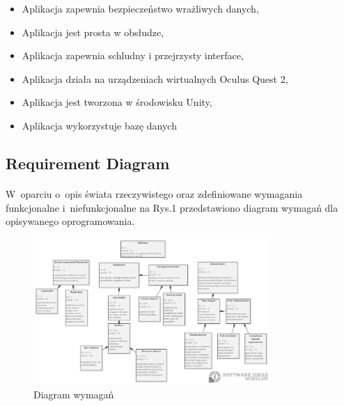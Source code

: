 \documentclass[12pt, letterpaper]{article}
\begin{document}
		
			\begin{itemize}
				\item Aplikacja zapewnia bezpieczeństwo wrażliwych danych,
				\item Aplikacja jest prosta w obsłudze,
				\item Aplikacja zapewnia schludny i przejrzysty interface,
				\item Aplikacja działa na urządzeniach wirtualnych Oculus Quest 2,
				\item Aplikacja jest tworzona w środowisku Unity,
				\item Aplikacja wykorzystuje bazę danych
			\end{itemize}
			
\subsection{Requirement Diagram}
\paragraph{}		
W~oparciu o~opis świata rzeczywistego oraz zdefiniowane wymagania funkcjonalne i~niefunkcjonalne na Rys.1 przedstawiono diagram wymagań dla opisywanego oprogramowania.
		
\begin{figure}[h]
  \centering
      \includegraphics[width=0.8\textwidth]{reqDiagram}
  \caption{Diagram wymagań}
\end{figure}
		
		
\newpage
\end{document}
